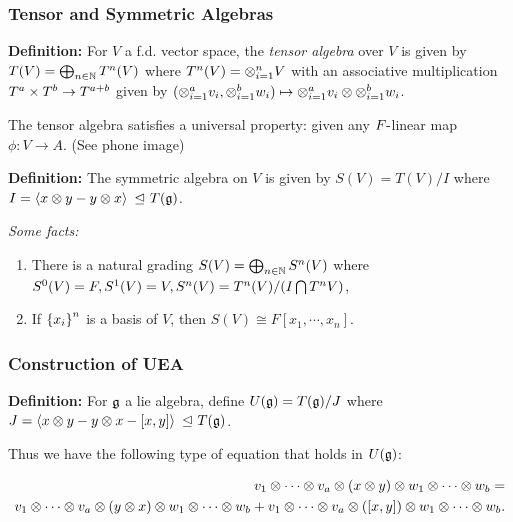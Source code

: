 \hypertarget{tensor-and-symmetric-algebras}{%
\subsubsection{Tensor and Symmetric
Algebras}\label{tensor-and-symmetric-algebras}}

\textbf{Definition:} For \(V\) a f.d. vector space, the \emph{tensor
algebra} over \(V\) is given by \(T(V) = \bigoplus_{n\in{\mathbb{N}}} T^n(V)\)
where \(T^n(V) = \otimes_{i=1}^n V\) with an associative multiplication
\(T^a \times T^b \to T^{a+b}\) given by
\((\otimes_{i=1}^a v_i, \otimes_{i=1}^b w_i) \mapsto \otimes_{i=1}^a v_i \otimes \otimes_{i=1}^b w_i\).

The tensor algebra satisfies a universal property: given any
\(F{\hbox{-}}\)linear map \(\phi: V \to A\). (See phone image)

\textbf{Definition:} The symmetric algebra on \(V\) is given by
\(S(V) = T(V) / I\) where
\(I = \left\langle{x\otimes y - y\otimes x}\right\rangle {~\trianglelefteq~} T({\mathfrak{g}})\).

\emph{Some facts:}

\begin{enumerate}
\def\labelenumi{\alph{enumi}.}
\tightlist
\item
  There is a natural grading \(S(V) = \bigoplus_{n\in{\mathbb{N}}} S^n(V)\) where
  \(S^0(V) = F, S^1(V) = V, S^n(V) = T^n(V) / (I \bigcap T^n V)\),
\item
  If \(\left\{{x_i}\right\}^n\) is a basis of \(V\), then
  \(S(V) \cong F[x_1, \cdots, x_n]\).
\end{enumerate}

\hypertarget{construction-of-uea}{%
\subsubsection{Construction of UEA}\label{construction-of-uea}}

\textbf{Definition:} For \({\mathfrak{g}}\) a lie algebra, define
\(U({\mathfrak{g}}) = T({\mathfrak{g}})/J\) where
\(J = \left\langle{x\otimes y - y\otimes x - [x,y]}\right\rangle {~\trianglelefteq~} T({\mathfrak{g}})\).

Thus we have the following type of equation that holds in \(U({\mathfrak{g}})\):

\begin{align*}
v_1 \otimes \cdots \otimes v_a \otimes (x\otimes y) \otimes w_1 \otimes \cdots \otimes w_b = \\
v_1 \otimes \cdots \otimes v_a \otimes (y\otimes x) \otimes w_1 \otimes \cdots \otimes w_b +
v_1 \otimes \cdots \otimes v_a \otimes ([x,y]) \otimes w_1 \otimes \cdots \otimes w_b
.\end{align*}

